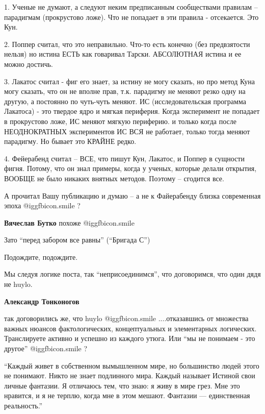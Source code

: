 \begin{itemize}
1. Ученые не думают, а следуют неким предписанным сообществами правилам –
парадигмам (прокрустово ложе). Что не попадает в эти правила - отсекается. Это
Кун.

2. Поппер считал, что это неправильно. Что-то есть конечно (без предвзятости
нельзя) но истина ЕСТЬ как говаривал Тарски. АБСОЛЮТНАЯ истина и ее можно
достичь.

3. Лакатос считал - фиг его знает, за истину не могу сказать, но про метод Куна
могу сказать, что он не вполне прав, т.к. парадигму не меняют резко одну на
другую, а постоянно по чуть-чуть меняют. ИС (исследовательская программа
Лакатоса) - это твердое ядро и мягкая периферия. Когда эксперимент не попадает
в прокрустово ложе, ИС меняют мягкую периферию. и только когда после
НЕОДНОКРАТНЫХ экспериментов ИС ВСЯ не работает, только тогда меняют парадигму.
Но бывает это КРАЙНЕ редко.

4. Фейерабенд считал – ВСЕ, что пишут Кун, Лакатос, и Поппер в сущности фигня.
Потому, что он знал примеры, когда у ученых, которые делали открытия, ВООБЩЕ не
было никаких внятных методов. Поэтому – сгодится все.

А прочитал Вашу публикацию и думаю – а не к Файерабенду близка современная
эпоха  @igg{fbicon.smile} ?

\textbf{Вячеслав Бутко} похоже  @igg{fbicon.smile} 

Зато \enquote{перед забором все равны} (\enquote{Бригада С})

Подождите, подождите.

Мы следуя логике поста, так \enquote{неприсоединимся}, что договоримся, что один дядя
не huylo.

\begin{itemize} %
\textbf{Александр Тонконогов} 

так договорились же, что huylo  @igg{fbicon.smile} ....отказавшись от множества важных нюансов
фактологических, концептуальных и элементарных логических. Транслируете активно
и успешно из каждого утюга. Или \enquote{мы не понимаем - это другое}  @igg{fbicon.smile}  ?

\end{itemize} %



\enquote{Каждый живет в собственном вымышленном мире, но большинство людей этого не
понимают. Никто не знает подлинного мира. Каждый называет Истиной свои личные
фантазии. Я отличаюсь тем, что знаю: я живу в мире грез. Мне это нравится, и я
не терплю, когда мне в этом мешают. Фантазии — единственная реальность.}


\end{itemize}
